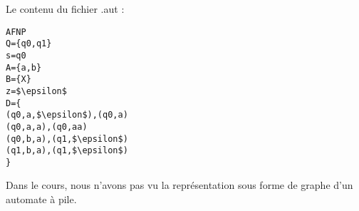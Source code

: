 \documentclass[12pt,a4paper]{article}
\begin{document}
\noindent Le contenu du fichier .aut :
\begin{lstlisting}[mathescape,frame=single]
AFNP
Q={q0,q1}
s=q0
A={a,b}
B={X}
z=$\epsilon$
D={
(q0,a,$\epsilon$),(q0,a)
(q0,a,a),(q0,aa)
(q0,b,a),(q1,$\epsilon$)
(q1,b,a),(q1,$\epsilon$)
}
\end{lstlisting}

Dans le cours, nous n'avons pas vu la représentation sous forme de graphe d'un automate à pile.
\end{document}
